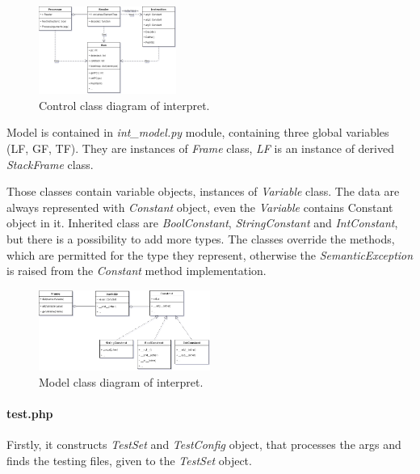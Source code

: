 \documentclass[10pt,a4paper,titlepage]{article}
\begin{document}
\begin{figure}[h!]
    \begin{center}
        \includegraphics[width=0.4\textwidth]{interpret_classes_control.png}
        \caption{Control class diagram of interpret. \label{fig:control}}
    \end{center}
\end{figure}

Model is contained in {\it int\_model.py} module, containing three global variables
(LF, GF, TF). They are instances of {\it Frame} class, {\it LF} is an instance of
derived {\it StackFrame} class. 

Those classes contain variable objects, instances of {\it Variable} class.
The data are always represented with {\it Constant} object, even the
{\it Variable} contains Constant object in it. Inherited class 
are {\it BoolConstant}, {\it StringConstant} and {\it IntConstant},
but there is a possibility to add more types. The classes override
the methods, which are permitted for the type they represent,
otherwise the {\it SemanticException} is raised from the {\it Constant}
method implementation.


\begin{figure}[h!]
    \begin{center}
        \includegraphics[width=0.5\textwidth]{interpret_classes_model.png}
        \caption{Model class diagram of interpret. \label{fig:model}}
    \end{center}
\end{figure}



\paragraph{test.php}
Firstly, it constructs {\it TestSet} and {\it TestConfig} object, that processes
the args and finds the testing files, given to the {\it TestSet} object.
\end{document}
